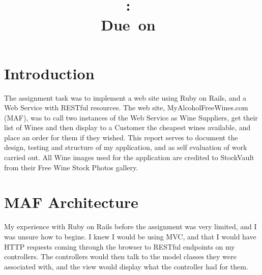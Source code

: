\documentclass[12pt]{article}
\title{
\vspace{2in}
\textmd{\textbf{\hmwkClass:\ \hmwkTitle}}\\
\normalsize\vspace{0.1in}\small{Due\ on\ \hmwkDueDate}\\
\vspace{3in}
}
\author{\textbf{\hmwkAuthorName}}
\date{} %
\begin{document}
\maketitle



\newpage
\tableofcontents
\newpage



\section{Introduction}

The assignment task\cite{assignment} was to implement a web site using Ruby on Rails, and a Web Service with RESTful resources. The web site, MyAlcoholFreeWines.com (MAF), was to call two instances of the Web Service as Wine Suppliers, get their list of Wines and then display to a Customer the cheapest wines available, and place an order for them if they wished. This report serves to document the design, testing and structure of my application, and as self evaluation of work carried out. All Wine images used for the application are credited to StockVault\cite{stockvault} from their Free Wine Stock Photos gallery.


\section{MAF Architecture}
My experience with Ruby on Rails before the assignment was very limited, and I was unsure how to begine. I knew I would be using MVC, and that I would have HTTP requests coming through the browser to RESTful endpoints on my controllers. The controllers would then talk to the model classes they were associated with, and the view would display what the controller had for them.
\end{document}
